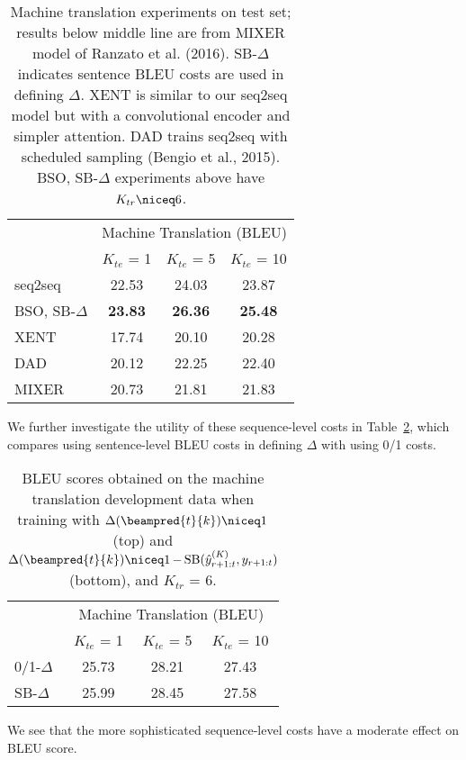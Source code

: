 \begin{table}[t!]
  \centering
  \begin{tabular}{lccc}
    \toprule
    & \multicolumn{3}{c}{Machine Translation (BLEU) } \\ 
    &  $K_{te}$ = 1 & $K_{te}$ = 5 & $K_{te}$ = 10 \\ 
    \midrule
    seq2seq & 22.53 & 24.03 & 23.87 \\
    BSO, SB-$\Delta$ & \textbf{23.83} & \textbf{26.36} & \textbf{25.48} \\
    \midrule
    XENT & 17.74 & 20.10 & 20.28 \\
    DAD & 20.12 & 22.25 & 22.40 \\ 
    MIXER & 20.73 & 21.81 & 21.83 \\    
    \bottomrule
  \end{tabular}
  \caption{Machine translation experiments on test set; results below middle line are from MIXER model of Ranzato et al. (2016). SB-$\Delta$ indicates sentence BLEU costs are used in defining $\Delta$.  XENT is similar to our seq2seq model but with a convolutional encoder and simpler attention. DAD trains seq2seq with scheduled sampling (Bengio et al., 2015). BSO, SB-$\Delta$ experiments above have $K_{tr} \niceq 6$.}
  \label{tab:mtfinal}
\end{table}

We further investigate the utility of these sequence-level costs in Table~\ref{tab:mtdelt}, which compares using sentence-level BLEU costs in defining $\Delta$ with using 0/1 costs.
\begin{table}[t!]
  \centering
  \begin{tabular}{lccc}
    \toprule
    & \multicolumn{3}{c}{Machine Translation (BLEU)} \\ 
     &  $K_{te}$ = 1 & $K_{te}$ = 5 & $K_{te}$ = 10 \\ 
    \midrule
    0/1-$\Delta$ & 25.73  & 28.21 & 27.43  \\  
        SB-$\Delta$ & 25.99  & 28.45 & 27.58 \\  
    \bottomrule
  \end{tabular}
  \caption{BLEU scores obtained on the machine translation development data when training with $\Delta(\beampred{t}{k}) \niceq 1$ (top) and $\Delta(\beampred{t}{k}) \niceq 1 \,{-}\,\mathrm{SB}(\hat{y}_{r+1:t}^{({K})}, y_{r+1:t})$ (bottom), and $K_{tr}$ = 6. }
\label{tab:mtdelt}
\end{table}
We see that the more sophisticated sequence-level costs have a moderate effect on BLEU score.

